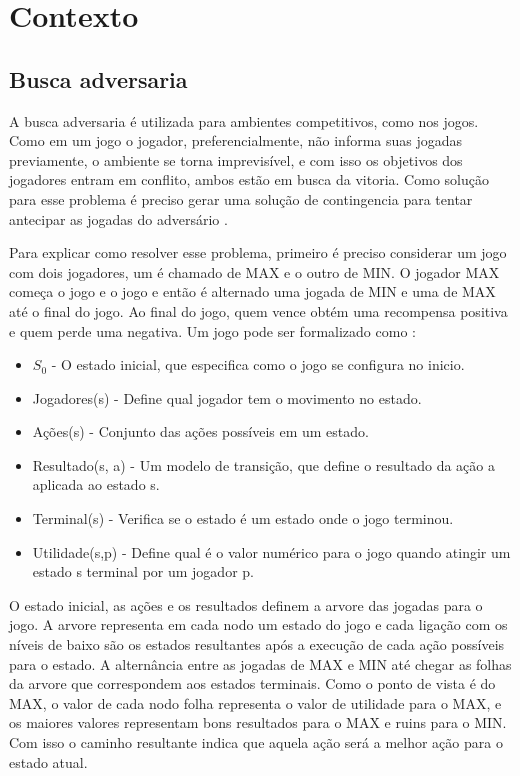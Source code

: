 \chapter{\label{chap:conte}Contexto}


\section{Busca adversaria}

A busca adversaria é utilizada para ambientes competitivos, como nos jogos. Como em um jogo o jogador, preferencialmente, não informa suas jogadas previamente, o ambiente se torna imprevisível, e com isso os objetivos dos jogadores entram em conflito, ambos estão em busca da vitoria. Como solução para esse problema é preciso gerar uma solução de contingencia para tentar antecipar as jogadas do adversário \cite{intelligence2003modern}. 

Para explicar como resolver esse problema, primeiro é preciso considerar um jogo com dois jogadores, um é chamado de MAX e o outro de MIN. O jogador MAX começa o jogo e o jogo e então é alternado uma jogada de MIN e uma de MAX até o final do jogo. Ao final do jogo, quem vence obtém uma recompensa positiva e quem perde uma negativa. Um jogo pode ser formalizado como \cite{intelligence2003modern}:

\begin{itemize}
	\item $S_{0}$ - O estado inicial, que especifica como o jogo se configura no inicio.
	\item Jogadores(s) -  Define qual jogador tem o movimento no estado.
	\item Ações(s) - Conjunto das ações possíveis em um estado.
	\item Resultado(s, a) - Um modelo de transição, que define o resultado da ação a aplicada ao estado s.
	\item Terminal(s) - Verifica se o estado é um estado onde o jogo terminou.
	\item Utilidade(s,p) - Define qual é o valor numérico para o jogo quando atingir um estado s terminal por um jogador p. 
\end{itemize}

O estado inicial, as ações e os resultados definem a arvore das jogadas para o jogo. A arvore representa em cada nodo um estado do jogo e cada ligação com os níveis de baixo são os estados resultantes após a execução de cada ação possíveis para o estado. A alternância entre as jogadas de MAX e MIN até chegar as folhas da arvore que correspondem aos estados terminais. Como o ponto de vista é do MAX, o valor de cada nodo folha representa o valor de utilidade para o MAX, e os maiores valores representam bons resultados para o MAX e ruins para o MIN. Com isso o caminho resultante indica que aquela ação será a melhor ação para o estado atual. 

